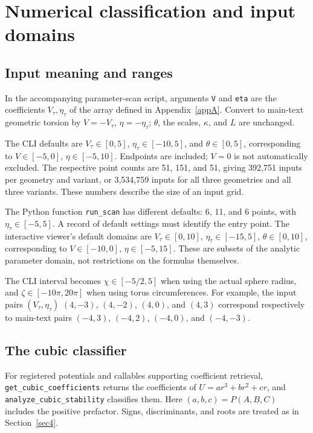 \section{Numerical classification and input domains}\label{appC}
\subsection{Input meaning and ranges}
In the accompanying parameter-scan script, arguments \texttt{V} and
\texttt{eta} are the coefficients $V_\tau,\eta_\tau$ of the array
defined in Appendix~\ref{appA}.
Convert to main-text geometric torsion by $V=-V_\tau$, $\eta=-\eta_\tau$;
$\theta$, the scales, $\kappa$, and $L$ are unchanged.

The CLI defaults are $V_\tau\in[0,5]$, $\eta_\tau\in[-10,5]$,
and $\theta\in[0,5]$, corresponding to $V\in[-5,0]$,
$\eta\in[-5,10]$. Endpoints are included; $V=0$ is not automatically
excluded. The respective point counts are 51, 151, and 51, giving
392,751 inputs per geometry and variant, or 3,534,759 inputs for all
three geometries and all three variants.
These numbers describe the size of an input grid.

The Python function \texttt{run\_scan} has different defaults:
6, 11, and 6 points, with $\eta_\tau\in[-5,5]$.
A record of default settings must identify the entry point.
The interactive viewer's default domains are
$V_\tau\in[0,10]$, $\eta_\tau\in[-15,5]$, $\theta\in[0,10]$,
corresponding to $V\in[-10,0]$, $\eta\in[-5,15]$.
These are subsets of the analytic parameter domain, not restrictions
on the formulas themselves.

The CLI interval becomes $\chi\in[-5/2,5]$ when using the actual sphere
radius, and $\zeta\in[-10\pi,20\pi]$ when using torus circumferences.
For example, the input pairs $(V_\tau,\eta_\tau)$
$(4,-3)$, $(4,-2)$, $(4,0)$, and $(4,3)$ correspond respectively
to main-text pairs $(-4,3)$, $(-4,2)$, $(-4,0)$, and $(-4,-3)$.

\subsection{The cubic classifier}
For registered potentials and callables supporting coefficient retrieval,
\texttt{get\_cubic\_coefficients} returns the coefficients of
$U=ar^3+br^2+cr$, and \texttt{analyze\_cubic\_stability} classifies them.
Here $(a,b,c)=P(A,B,C)$ includes the positive prefactor.
Signs, discriminants, and roots are treated as in Section~\ref{sec4}.

